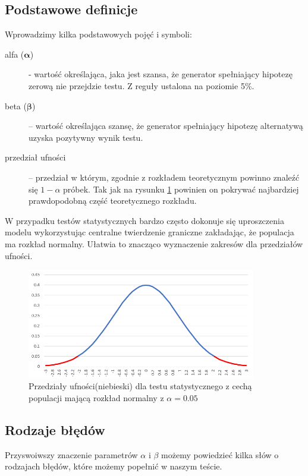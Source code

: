 \subsection{Podstawowe definicje}
Wprowadzimy kilka podstawowych pojęć i symboli:
\begin{description}
\item[alfa ($\mathbf{\alpha}$)] - wartość określająca, jaka jest szansa, że generator spełniający hipotezę zerową nie przejdzie testu. Z reguły ustalona na poziomie 5\%.
\item[beta ($\mathbf{\beta}$)] – wartość określająca szansę, że generator spełniający hipotezę alternatywą uzyska pozytywny wynik testu.
\item[przedział ufności] – przedział w którym, zgodnie z rozkładem teoretycznym powinno znaleźć się $1-\alpha$ próbek. Tak jak na rysunku \ref{fig:confidence_interval} powinien on pokrywać najbardziej prawdopodobną część teoretycznego rozkładu. 
\end{description}
W przypadku testów statystycznych bardzo często dokonuje się uproszczenia modelu wykorzystując centralne twierdzenie graniczne zakładając, że populacja ma rozkład normalny. 
Ułatwia to znacząco wyznaczenie zakresów dla przedziałów ufności.
\begin{figure}[!htp]
    \centering
    \includegraphics[width=10cm]{confidence_interval}
    \caption{Przedziały ufności(niebieski) dla testu statystycznego z cechą populacji mającą rozkład normalny z $\alpha=0.05$}
    \label{fig:confidence_interval}
\end{figure}
\subsection{Rodzaje błędów}
Przyswoiwszy znaczenie parametrów $\alpha$ i $\beta$ możemy powiedzieć kilka słów o rodzajach błędów, które możemy popełnić w naszym teście.

